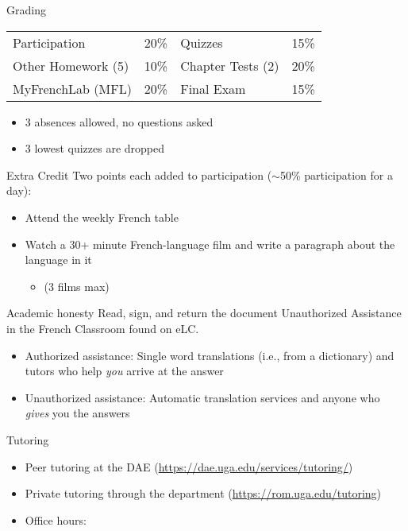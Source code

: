 \documentclass{beamer}
\begin{document}
  \begin{frame}{Grading}
    \begin{center}
      \begin{tabular}{l l | l l}
        Participation      & 20\% & Quizzes           & 15\% \\
        Other Homework (5) & 10\% & Chapter Tests (2) & 20\% \\
        MyFrenchLab (MFL)  & 20\% & Final Exam        & 15\% \\
      \end{tabular}
    \end{center}
    \begin{itemize}
      \item 3 absences allowed, no questions asked
      \item 3 lowest quizzes are dropped
    \end{itemize}
  \end{frame}

  \begin{frame}{Extra Credit}
    Two points each added to participation ($\sim$50\% participation for a day):
    \begin{itemize}
      \item Attend the weekly French table
      \item Watch a 30+ minute French-language film and write a paragraph about the language in it
      \begin{itemize}
        \item (3 films max)
      \end{itemize}
    \end{itemize}
  \end{frame}

  \begin{frame}{Academic honesty}
    Read, sign, and return the document Unauthorized Assistance in the French Classroom found on eLC.
    \begin{itemize}
      \item Authorized assistance: Single word translations (i.e., from a dictionary) and tutors who help \emph{you} arrive at the answer
      \item Unauthorized assistance: Automatic translation services and anyone who \emph{gives} you the answers
    \end{itemize}
  \end{frame}

  \begin{frame}{Tutoring}
    \begin{itemize}
      \item Peer tutoring at the DAE (\url{https://dae.uga.edu/services/tutoring/})
      \item Private tutoring through the department (\url{https://rom.uga.edu/tutoring})
      \item Office hours: 
    \end{itemize}
  \end{frame}
\end{document}
